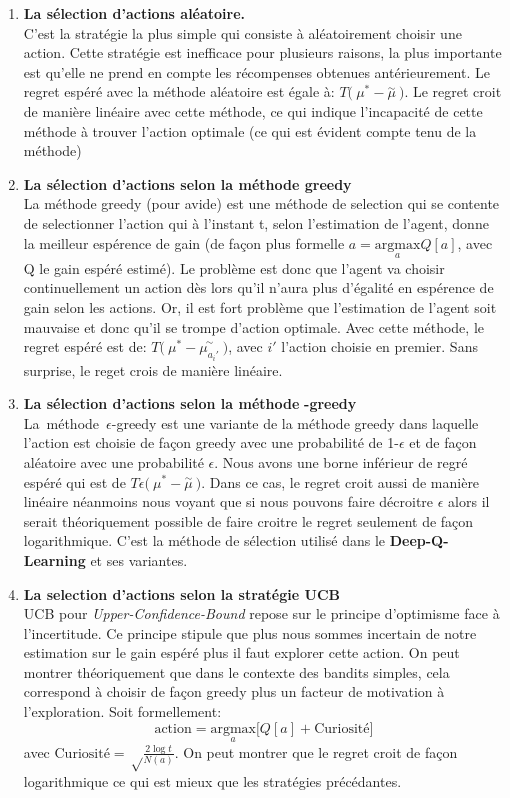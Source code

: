 \begin{enumerate}
\item \textbf{La sélection d'actions aléatoire.}\\
C'est la stratégie la plus simple qui consiste à aléatoirement choisir une action. Cette stratégie est inefficace pour plusieurs raisons, la plus importante est qu'elle ne prend en compte les récompenses obtenues antérieurement.
Le regret espéré avec la méthode aléatoire est égale à: $T \big(\:\mu^* - \overset{\sim}{\mu}\: \big)$. Le regret croit de manière linéaire avec cette méthode, ce qui indique l'incapacité de cette méthode à trouver l'action optimale (ce qui est évident compte tenu de la méthode)
\item \textbf{La sélection d'actions selon la méthode greedy}\\
    La méthode greedy (pour avide) est une méthode de selection qui se contente de selectionner l'action qui à l'instant t, selon l'estimation de l'agent, donne la meilleur espérence de gain (de façon plus formelle $ a = \underset{a}{\text{argmax}} Q[a]$, avec Q le gain espéré estimé). Le problème est donc que l'agent va choisir continuellement un action dès lors qu'il n'aura plus d'égalité en espérence de gain selon les actions. Or, il est fort problème que l'estimation de l'agent soit mauvaise et donc qu'il se trompe d'action optimale. Avec cette méthode, le regret espéré est de: $T \big(\:\mu^* - \overset{\sim}{\mu_{a_i'}}\: \big)$, avec $i'$ l'action choisie en premier. Sans surprise, le reget crois de manière linéaire.
\item \textbf{La sélection d'actions selon la méthode} \bm{\epsilon} \textbf{-greedy} \\
    La\ méthode\ $\epsilon$-greedy est une variante de la méthode greedy dans laquelle l'action est choisie de façon greedy avec une probabilité de 1-$\epsilon$ et de façon aléatoire avec une probabilité $\epsilon$. Nous avons une borne inférieur de regré espéré qui est de $T \epsilon \big(\:\mu^* - \overset{\sim}{\mu}\: \big)$. Dans ce cas, le regret croit aussi de manière linéaire néanmoins nous voyant que si nous pouvons faire décroitre $\epsilon$ alors il serait théoriquement possible de faire croitre le regret seulement de façon logarithmique. C'est la méthode de sélection utilisé dans le \textbf{Deep-Q-Learning} et ses variantes. 

\item \textbf{La selection d'actions selon la stratégie UCB} \\
    \gls{UCB} pour \emph{Upper-Confidence-Bound} repose sur le principe d'optimisme face à l'incertitude. Ce principe stipule que plus nous sommes incertain de notre estimation sur le gain espéré plus il faut explorer cette action. On peut montrer théoriquement que dans le contexte des bandits simples, cela correspond à choisir de façon greedy plus un facteur de motivation à l'exploration. Soit formellement: 
    $$ \text{action} = \underset{a}{\text{argmax}}\bigg[Q[a] + \text{Curiosité}\bigg]  $$
    avec $\text{Curiosité} = \sqrt\frac{2\log t}{N(a)}$. On peut montrer que le regret croit de façon logarithmique ce qui est mieux que les stratégies précédantes.
\end{enumerate}

